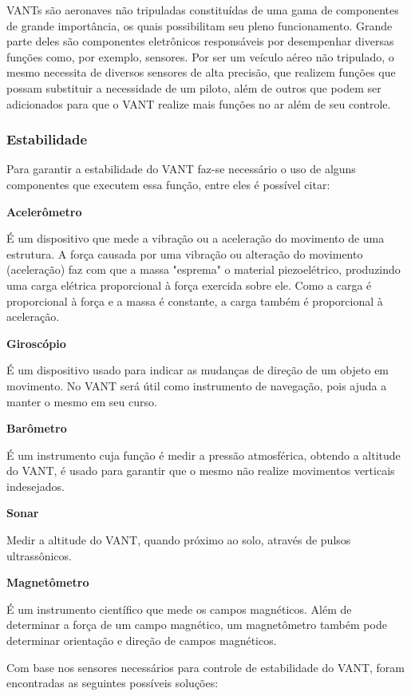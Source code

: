 VANTs são aeronaves não tripuladas constituídas de uma gama de componentes de grande importância, os quais possibilitam seu pleno funcionamento. Grande parte deles são componentes eletrônicos responsáveis por desempenhar diversas funções como, por exemplo, sensores. Por ser um veículo aéreo não tripulado, o mesmo necessita de diversos sensores de alta precisão, que realizem funções que possam substituir a necessidade de um piloto, além de outros que podem ser adicionados para que o VANT realize mais funções no ar além de seu controle.

\subsubsection{Estabilidade}

Para garantir a estabilidade do VANT faz-se necessário o uso de alguns componentes que executem essa função, entre eles é possível citar:

\textbf{Acelerômetro}

É um dispositivo que mede a vibração ou a aceleração do movimento de uma estrutura. A força causada por uma vibração ou alteração do movimento (aceleração) faz com que a massa "esprema" o material piezoelétrico, produzindo uma carga elétrica proporcional à força exercida sobre ele. Como a carga é proporcional à força e a massa é constante, a carga também é proporcional à aceleração. \cite{acelerometro2013}

\textbf{Giroscópio}

É um dispositivo usado para indicar as mudanças de direção de um objeto em movimento. No VANT será útil como instrumento de navegação, pois ajuda a manter o mesmo em seu curso. \cite{giroscopio2013}

\textbf{Barômetro}

É um instrumento cuja função é medir a pressão atmosférica, obtendo a altitude do VANT, é usado para garantir que o mesmo não realize movimentos verticais indesejados.

\textbf{Sonar}

Medir a altitude do VANT, quando próximo ao solo, através de pulsos ultrassônicos.

\textbf{Magnetômetro}

É um instrumento científico que mede os campos magnéticos. Além de determinar a força de um campo magnético, um magnetômetro também pode determinar orientação e direção de campos magnéticos. \cite{magnetometro2012}

Com base nos sensores necessários para controle de estabilidade do VANT, foram encontradas as seguintes possíveis soluções:

